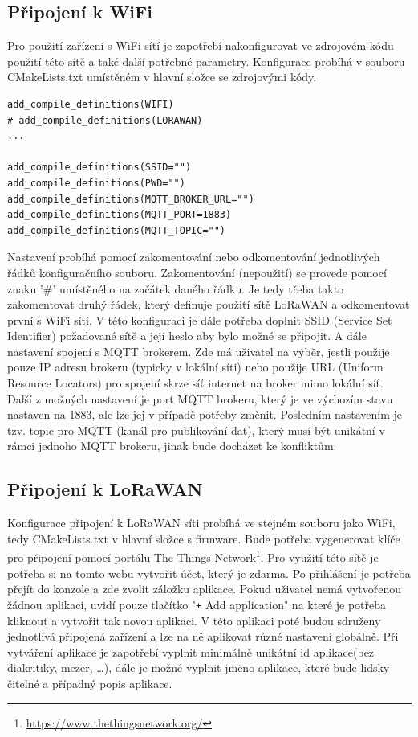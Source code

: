 \subsection{Připojení k WiFi}

Pro použití zařízení s WiFi sítí je zapotřebí nakonfigurovat ve zdrojovém kódu použití této sítě a také další potřebné parametry. Konfigurace probíhá v souboru CMakeLists.txt umístěném v hlavní složce se zdrojovými kódy.

\begin{lstlisting}[caption={Nastavení spojení pomocí WiFi}]
add_compile_definitions(WIFI)
# add_compile_definitions(LORAWAN)
...

add_compile_definitions(SSID="")
add_compile_definitions(PWD="")
add_compile_definitions(MQTT_BROKER_URL="")
add_compile_definitions(MQTT_PORT=1883)
add_compile_definitions(MQTT_TOPIC="")
\end{lstlisting}

Nastavení probíhá pomocí zakomentování nebo odkomentování jednotlivých řádků konfiguračního souboru. Zakomentování (nepoužití) se provede pomocí znaku '\#' umístěného na začátek daného řádku. Je tedy třeba takto zakomentovat druhý řádek, který definuje použití sítě LoRaWAN a odkomentovat první s WiFi sítí.
V této konfiguraci je dále potřeba doplnit SSID (Service Set Identifier) požadované sítě a její heslo aby bylo možné se připojit. A dále nastavení spojení s MQTT brokerem. Zde má uživatel na výběr, jestli použije pouze IP adresu brokeru (typicky v lokální síti) nebo použije URL (Uniform Resource Locators) pro spojení skrze síť internet na broker mimo lokální síť. Další z možných nastavení je port MQTT brokeru, který je ve výchozím stavu nastaven na \SI{1883}{}, ale lze jej v případě potřeby změnit. Posledním nastavením je tzv. topic pro MQTT (kanál pro publikování dat), který musí být unikátní v rámci jednoho MQTT brokeru, jinak bude docházet ke konfliktům.

\subsection{Připojení k LoRaWAN}

Konfigurace připojení k LoRaWAN síti probíhá ve stejném souboru jako WiFi, tedy CMakeLists.txt v hlavní složce s firmware. Bude potřeba vygenerovat klíče pro připojení pomocí portálu The Things Network\footnote{\url{https://www.thethingsnetwork.org/}}. Pro využití této sítě je potřeba si na tomto webu vytvořit účet, který je zdarma. Po přihlášení je potřeba přejít do konzole a zde zvolit záložku aplikace. Pokud uživatel nemá vytvořenou žádnou aplikaci, uvidí pouze tlačítko "\texttt{+} Add application"{} na které je potřeba kliknout a vytvořit tak novou aplikaci. V této aplikaci poté budou sdruženy jednotlivá připojená zařízení a lze na ně aplikovat různé nastavení globálně. Při vytváření aplikace je zapotřebí vyplnit minimálně unikátní id aplikace(bez diakritiky, mezer, \dots), dále je možné vyplnit jméno aplikace, které bude lidsky čitelné a případný popis aplikace.

